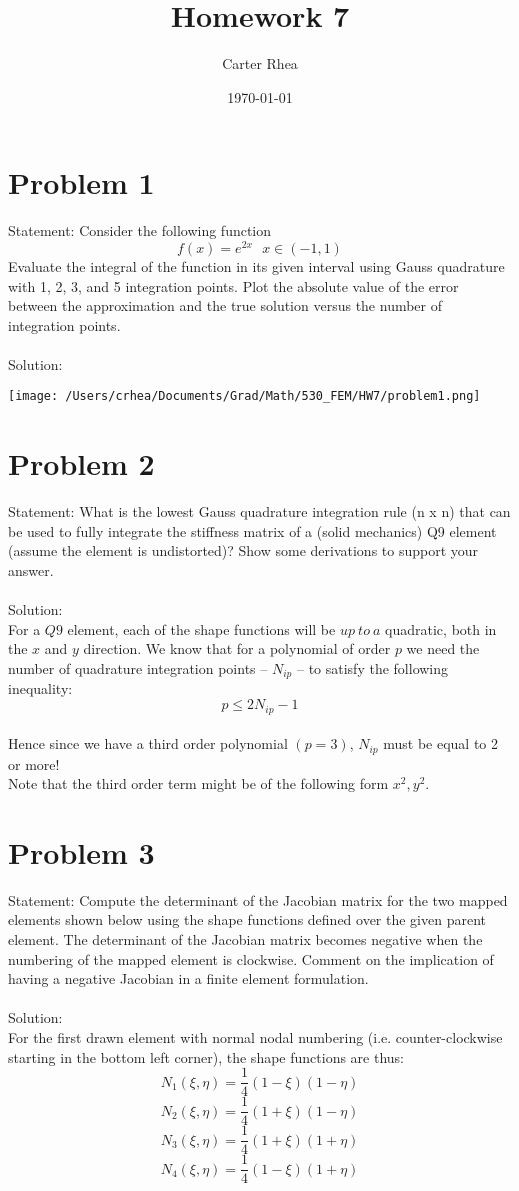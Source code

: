 \documentclass[11pt]{amsart}
\title{Homework 7}
\author{Carter Rhea}
\date{\today}
\begin{document}
\maketitle
\section{Problem 1}
Statement: Consider the following function
$$f(x)=e^{2x} \ \ \ x \in (-1,1) $$
Evaluate the integral of the function in its given interval using Gauss quadrature with 1, 2,
3, and 5 integration points. Plot the absolute value of the error between the approximation
and the true solution versus the number of integration points.
\\ \\
Solution:
\begin{center}
\texttt{[image: /Users/crhea/Documents/Grad/Math/530\_FEM/HW7/problem1.png]}
\end{center}
\pagebreak
\section{Problem 2}
Statement: What is the lowest Gauss quadrature integration rule (n x n) that can be used
to fully integrate the stiffness matrix of a (solid mechanics) Q9 element (assume the
element is undistorted)? Show some derivations to support your answer.\\ \\
Solution:\\
For a $Q9$ element, each of the shape functions will be $up \ to \ a$ quadratic, both in the $x$ and $y$ direction. We know that for a polynomial of order $p$ we need the number of quadrature integration points -- $N_{ip}$ -- to satisfy the following inequality:
$$p \leq 2N_{ip}-1 $$
\\
Hence since we have a third order polynomial $(p=3)$, $N_{ip}$ must be equal to 2 or more!\\
Note that the third order term might be of the following form $x^2,y^2$.\\


\section{Problem 3}
Statement: Compute the determinant of the Jacobian matrix for the two mapped
elements shown below using the shape functions defined over the given parent element.
The determinant of the Jacobian matrix becomes negative when the numbering of the
mapped element is clockwise. Comment on the implication of having a negative Jacobian
in a finite element formulation. \\ \\ 
Solution:\\
For the first drawn element with normal nodal numbering (i.e. counter-clockwise starting in the bottom left corner), the shape functions are thus:
$$N_1(\xi,\eta)  = \frac{1}{4}(1-\xi)(1-\eta)$$
$$N_2(\xi,\eta)  = \frac{1}{4}(1+\xi)(1-\eta)$$
$$N_3(\xi,\eta)  = \frac{1}{4}(1+\xi)(1+\eta)$$
$$N_4(\xi,\eta)  = \frac{1}{4}(1-\xi)(1+\eta)$$
\end{document}
